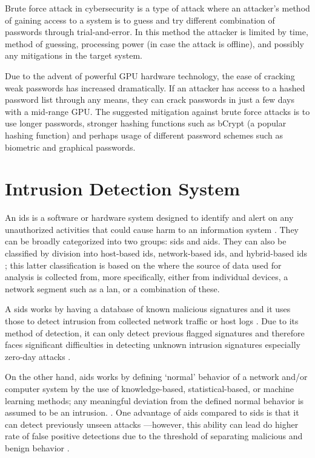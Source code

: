 Brute force attack in cybersecurity is a type of attack where an attacker's method of gaining access to a system is to guess and try different combination of passwords through trial-and-error.
In this method the attacker is limited by time, method of guessing, processing power (in case the attack is offline), and possibly any mitigations in the target system.

Due to the advent of powerful GPU hardware technology, the ease of cracking weak passwords has increased dramatically.
If an attacker has access to a hashed password list through any means, they can crack passwords in just a few days with a mid-range GPU.
The suggested mitigation against brute force attacks is to use longer passwords, stronger hashing functions such as bCrypt (a popular hashing function) and perhaps usage of different password schemes such as biometric and graphical passwords.~\cite{ieee:brute-force}

\section{Intrusion Detection System}\label{sec:ids}

An \gls{ids} is a software or hardware system designed to identify and alert on any unauthorized activities that could cause harm to an information system \cite{Khraisat2019}.
They can be broadly categorized into two groups: \gls{sids} and \gls{aids}.
They can also be classified by division into host-based \gls{ids}, network-based \gls{ids}, and hybrid-based \gls{ids} \cite{rajasekaran2012classification};
this latter classification is based on the where the source of data used for analysis is collected from,
more specifically, either from individual devices, a network segment such as a \gls{lan}, or a combination of these.

A \gls{sids} works by having a database of known malicious signatures and it uses those to detect intrusion from collected network traffic or host logs \cites{ieee:ids-classification}{rajasekaran2012classification}{Khraisat2019}.
Due to its method of detection, it can only detect previous flagged signatures and therefore faces significant difficulties in detecting unknown intrusion signatures especially \gls{zero-day} attacks \cite{Khraisat2019}.

On the other hand, \gls{aids} works by defining `normal' behavior of a network and/or computer system by the use of knowledge-based, statistical-based, or machine learning methods; any meaningful deviation from the defined normal behavior is assumed to be an intrusion. \cite{Khraisat2019}.
One advantage of \gls{aids} compared to \gls{sids} is that it can detect previously unseen attacks \cite{rajasekaran2012classification}\cite{ieee:ids-classification}---however, this ability can lead do higher rate of false positive detections due to the threshold of separating malicious and benign behavior \cite{Khraisat2019}.

